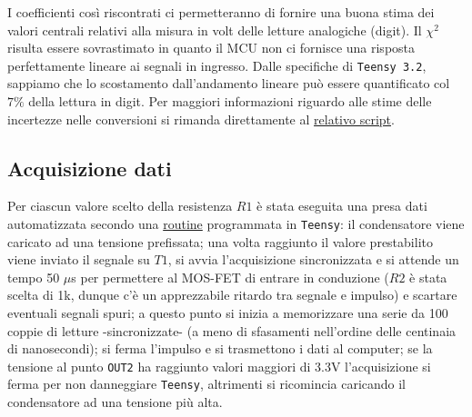 \documentclass{article}[a4paper, oneside, 11pt]
\begin{document}
I coefficienti così riscontrati ci permetteranno di fornire una buona stima 
dei valori centrali relativi alla misura in volt delle letture analogiche 
(digit). Il $\chi^2$ risulta essere sovrastimato in quanto il MCU non ci 
fornisce una risposta perfettamente lineare ai segnali in ingresso. Dalle 
specifiche di \verb+Teensy 3.2+, sappiamo che lo scostamento dall’andamento lineare 
può essere quantificato col $7 \%$ della lettura in digit.\newline
Per maggiori informazioni riguardo alle stime delle incertezze nelle 
conversioni si rimanda direttamente al 
\href{https://github.com/LucaCiucci/relaz_seme/blob/master/Cartella_fit/funzioni.py}
{relativo script}.

\subsection{Acquisizione dati}
Per ciascun valore scelto della resistenza $R1$ è stata eseguita una presa 
dati automatizzata secondo una 
\href{https://github.com/LucaCiucci/relaz_seme/blob/master/sketches/teensy_differenziale_definitivo/teensy_differenziale_definitivo.ino}{routine} programmata 
in \verb+Teensy+: il condensatore viene caricato ad una tensione prefissata;
una volta raggiunto il valore prestabilito viene inviato il segnale su $T1$,
si avvia l'acquisizione sincronizzata e si attende un tempo 50 $\mu$s per
permettere al MOS-FET di entrare in conduzione ($R2$ è stata scelta di 1k,
dunque c'è un apprezzabile ritardo tra segnale e impulso) e scartare eventuali
segnali spuri; a questo punto si inizia a memorizzare una serie da 100 coppie
di letture -sincronizzate- (a meno di sfasamenti nell'ordine delle centinaia di 
nanosecondi); si ferma l'impulso e si trasmettono i dati al computer; se la 
tensione al punto \verb+OUT2+ ha raggiunto valori maggiori di 3.3V 
l'acquisizione si ferma per non danneggiare \verb+Teensy+, altrimenti si
ricomincia caricando il condensatore ad una tensione più alta.

\end{document}
